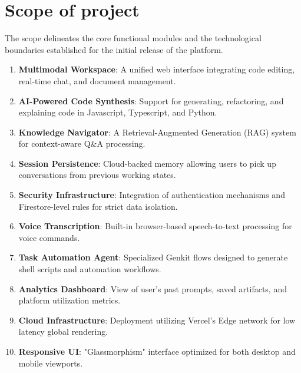 \section{Scope of project}
The scope delineates the core functional modules and the technological boundaries established for the initial release of the platform.
\begin{enumerate}
    \item \textbf{Multimodal Workspace}: A unified web interface integrating code editing, real-time chat, and document management.
    \item \textbf{AI-Powered Code Synthesis}: Support for generating, refactoring, and explaining code in Javascript, Typescript, and Python.
    \item \textbf{Knowledge Navigator}: A Retrieval-Augmented Generation (RAG) system for context-aware Q\&A processing.
    \item \textbf{Session Persistence}: Cloud-backed memory allowing users to pick up conversations from previous working states.
    \item \textbf{Security Infrastructure}: Integration of authentication mechanisms and Firestore-level rules for strict data isolation.
    \item \textbf{Voice Transcription}: Built-in browser-based speech-to-text processing for voice commands.
    \item \textbf{Task Automation Agent}: Specialized Genkit flows designed to generate shell scripts and automation workflows.
    \item \textbf{Analytics Dashboard}: View of user's past prompts, saved artifacts, and platform utilization metrics.
    \item \textbf{Cloud Infrastructure}: Deployment utilizing Vercel's Edge network for low latency global rendering.
    \item \textbf{Responsive UI}: "Glassmorphism" interface optimized for both desktop and mobile viewports.
\end{enumerate}

